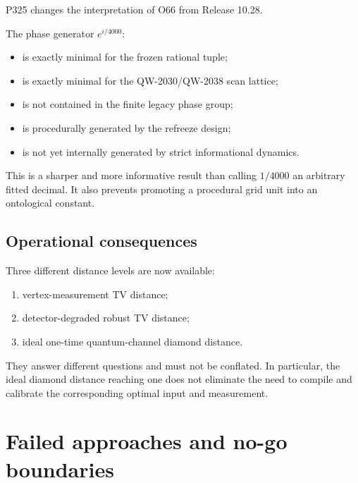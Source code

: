 \documentclass[11pt,a4paper,openany]{report}
\begin{document}
P325 changes the interpretation of O66 from Release 10.28.

The phase generator \(e^{i/4000}\):

\begin{itemize}
\item 
is exactly minimal for the frozen rational tuple;

\item 
is exactly minimal for the QW-2030/\allowbreak{}QW-2038 scan lattice;

\item 
is not contained in the finite legacy phase group;

\item 
is procedurally generated by the refreeze design;

\item 
is not yet internally generated by strict informational dynamics.

\end{itemize}

This is a sharper and more informative result than calling \(1/4000\) an arbitrary fitted decimal.  It also prevents promoting a procedural grid unit into an ontological constant.

\section{Operational consequences}

Three different distance levels are now available:

\begin{enumerate}
\item 
vertex-measurement TV distance;

\item 
detector-degraded robust TV distance;

\item 
ideal one-time quantum-channel diamond distance.

\end{enumerate}

They answer different questions and must not be conflated.  In particular, the ideal diamond distance reaching one does not eliminate the need to compile and calibrate the corresponding optimal input and measurement.

\chapter{Failed approaches and no-go boundaries}
\end{document}
